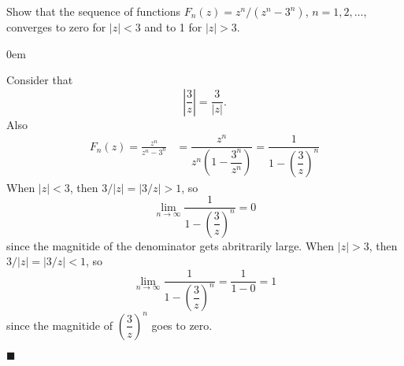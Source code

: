 \documentclass[12pt]{article}
\author{Warren Atkison}
\date{\today}
\renewcommand{\qed}{\hfill$\blacksquare$}
\renewenvironment{proof}{\vspace{1em}\begin{addmargin}[2em]{0em}\begin{newproof}}{\end{newproof}\end{addmargin}\qed}
\newenvironment{exercise}[2][Exercise]{\begin{trivlist}
\item[\hskip \labelsep {\bfseries #1} \hskip \labelsep {\bfseries #2.}]}{\end{trivlist}}
\begin{document}
\fancyhf{}
\fancyhead[R]{\today}
\fancyfoot[R]{\thepage}

\begin{exercise}{10}
	Show that the sequence of functions $F_n(z) = z^n/(z^n - 3^n)$, $n = 1,2,\ldots$, converges to zero for $|z| < 3$ and to 1 for $|z| > 3$.
\end{exercise}
\begin{proof} Consider that
	\[
		\left|\frac{3}{z}\right| = \frac{3}{|z|}.
	\]
	Also
	\begin{align*}
		F_n(z) = \frac{z^n}{z^n-3^n} &= \dfrac{z^n}{z^n\left(1 - \dfrac{3^n}{z^n}\right)} = \dfrac{1}{1 - \left(\dfrac{3}{z}\right)^n}
	\end{align*}
	When $|z| < 3$, then $3/|z| = |3/z| > 1$, so
	\[
		\lim_{n \to \infty} \dfrac{1}{1 - \left(\dfrac{3}{z}\right)^n} = 0
	\]
	since the magnitide of the denominator gets abritrarily large. When $|z| > 3$, then $3/|z| = |3/z| < 1$, so
	\[
		\lim_{n \to \infty} \dfrac{1}{1 - \left(\dfrac{3}{z}\right)^n} = \frac{1}{1 - 0} =  1
	\]
	since the magnitide of $\left(\dfrac{3}{z}\right)^n$ goes to zero.
\end{proof}
\end{document}
